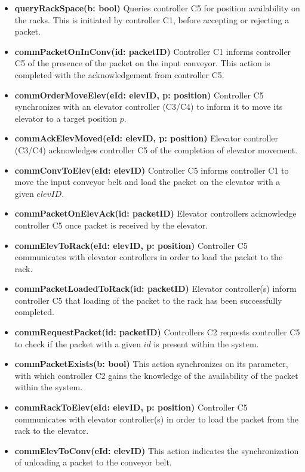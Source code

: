 \begin{itemize}
\item \textbf{queryRackSpace(b: bool)}
Queries controller C5 for position availability on the racks. This is initiated by controller C1, before accepting or rejecting a packet.

\item \textbf{commPacketOnInConv(id: packetID)}
Controller C1 informs controller C5 of the presence of the packet on the input conveyor. This action is completed with the acknowledgement from controller C5.

\item \textbf{commOrderMoveElev(eId: elevID, p: position)}
Controller C5 synchronizes with an elevator controller (C3/C4) to inform it to move its elevator to a target position $p$.

\item \textbf{commAckElevMoved(eId: elevID, p: position)}
Elevator controller (C3/C4) acknowledges controller C5 of the completion of elevator movement.

\item \textbf{commConvToElev(eId: elevID)}
Controller C5 informs controller C1 to move the input conveyor belt and load the packet on the elevator with a given $elevID$.

\item \textbf{commPacketOnElevAck(id: packetID)}
Elevator controllers acknowledge controller C5 once packet is received by the elevator.

\item \textbf{commElevToRack(eId: elevID, p: position)}
Controller C5 communicates with elevator controllers in order to load the packet to the rack.

\item \textbf{commPacketLoadedToRack(id: packetID)}
Elevator controller(s) inform controller C5 that loading of the packet to the rack has been successfully completed.

\item \textbf{commRequestPacket(id: packetID)}
Controllers C2 requests controller C5 to check if the packet with a given $id$ is present within the system.

\item \textbf{commPacketExists(b: bool)}
This action synchronizes on its parameter, with which controller C2 gains the knowledge of the availability of the packet within the system.

\item \textbf{commRackToElev(eId: elevID, p: position)}
Controller C5 communicates with elevator controller(s) in order to load the packet from the rack to the elevator.

\item \textbf{commElevToConv(eId: elevID)}
This action indicates the synchronization of unloading a packet to the conveyor belt.

\end{itemize}

